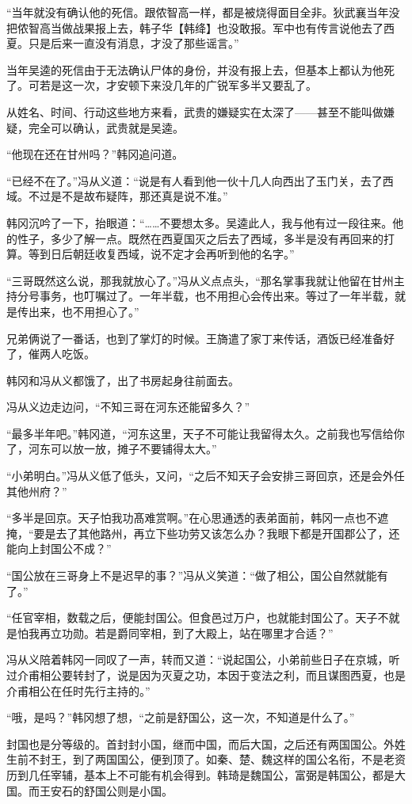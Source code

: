 “当年就没有确认他的死信。跟侬智高一样，都是被烧得面目全非。狄武襄当年没把侬智高当做战果报上去，韩子华【韩绛】也没敢报。军中也有传言说他去了西夏。只是后来一直没有消息，才没了那些谣言。”

当年吴逵的死信由于无法确认尸体的身份，并没有报上去，但基本上都认为他死了。可若是这一次，才安顿下来没几年的广锐军多半又要乱了。

从姓名、时间、行动这些地方来看，武贵的嫌疑实在太深了——甚至不能叫做嫌疑，完全可以确认，武贵就是吴逵。

“他现在还在甘州吗？”韩冈追问道。

“已经不在了。”冯从义道：“说是有人看到他一伙十几人向西出了玉门关，去了西域。不过是不是故布疑阵，那还真是说不准。”

韩冈沉吟了一下，抬眼道：“……不要想太多。吴逵此人，我与他有过一段往来。他的性子，多少了解一点。既然在西夏国灭之后去了西域，多半是没有再回来的打算。等到日后朝廷收复西域，说不定才会再听到他的名字。”

“三哥既然这么说，那我就放心了。”冯从义点点头，“那名掌事我就让他留在甘州主持分号事务，也叮嘱过了。一年半载，也不用担心会传出来。等过了一年半载，就是传出来，也不用担心了。”

兄弟俩说了一番话，也到了掌灯的时候。王旖遣了家丁来传话，酒饭已经准备好了，催两人吃饭。

韩冈和冯从义都饿了，出了书房起身往前面去。

冯从义边走边问，“不知三哥在河东还能留多久？”

“最多半年吧。”韩冈道，“河东这里，天子不可能让我留得太久。之前我也写信给你了，河东可以放一放，摊子不要铺得太大。”

“小弟明白。”冯从义低了低头，又问，“之后不知天子会安排三哥回京，还是会外任其他州府？”

“多半是回京。天子怕我功髙难赏啊。”在心思通透的表弟面前，韩冈一点也不遮掩，“要是去了其他路州，再立下些功劳又该怎么办？我眼下都是开国郡公了，还能向上封国公不成？”

“国公放在三哥身上不是迟早的事？”冯从义笑道：“做了相公，国公自然就能有了。”

“任官宰相，数载之后，便能封国公。但食邑过万户，也就能封国公了。天子不就是怕我再立功勋。若是爵同宰相，到了大殿上，站在哪里才合适？”

冯从义陪着韩冈一同叹了一声，转而又道：“说起国公，小弟前些日子在京城，听过介甫相公要转封了，说是因为灭夏之功，本因于变法之利，而且谋图西夏，也是介甫相公在任时先行主持的。”

“哦，是吗？”韩冈想了想，“之前是舒国公，这一次，不知道是什么了。”

封国也是分等级的。首封封小国，继而中国，而后大国，之后还有两国国公。外姓生前不封王，到了两国国公，便到顶了。如秦、楚、魏这样的国公名衔，不是老资历到几任宰辅，基本上不可能有机会得到。韩琦是魏国公，富弼是韩国公，都是大国。而王安石的舒国公则是小国。

